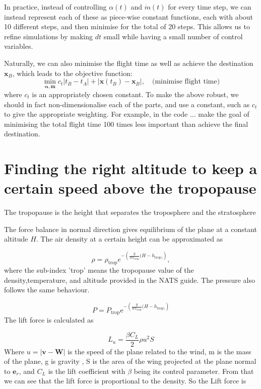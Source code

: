 \documentclass{article}
\renewcommand{\vec}[1]{\boldsymbol{#1}}
\begin{document}
In practice, instead of controlling $\alpha(t)$ and $\dot m(t)$ for every time step, we can instead represent each of these as piece-wise constant functions, each with about 10 different steps, and then minimise for the total of 20 steps. This allows us to refine simulations by making $dt$ small while having a small number of control variables.

Naturally, we can also minimise the flight time as well as achieve the destination $\vec x_B$, which leads to the objective function:
\[
\min_{\vec \alpha, \dot{\vec m}} c_t | t_B - t_A| + | \vec x(t_B) - \vec x_B|, \quad \text{(minimise flight time)}
\]
where $c_t$ is an appropriately chosen constant. To make the above robust, we should in fact non-dimensionalise each of the parts, and use a constant, such as $c_t$ to give the appropriate weighting. For example, in the code ... make the goal of minimising the total flight time 100 times less important than achieve the final destination.

\section{Finding the right altitude to keep a certain speed above the tropopause}

The tropopause is the height that separates the troposphere and the stratosphere 

The force balance in normal direction gives equilibrium of the plane at a constant altitude $H$. 
The air density at a certain height can be approximated as

\begin{equation}
    \rho= \rho_{\text{trop}}e^{-\left( \frac{g}{RT_{\text{trop}}}(H-h_{\text{trop})} \right)},
\end{equation}
where the sub-index 'trop' means the tropopause value of the density,temperature, and altitude provided in the NATS guide. The pressure also follows the same behaviour.

\begin{equation}
    P= P_{\text{trop}}\mathrm{e}^{-\left( \frac{g}{RT_{\text{trop}}}(H-h_{\text{trop})} \right)}
\end{equation}
The lift force is calculated as

\begin{equation}
    L_u= \frac{\beta C_L}{2} \rho u^2S
\end{equation}
Where $u=|\vec{v}-\vec{W}|$ is the speed of the plane related to the wind, m is the mass of the plane, g is gravity , S is the area of the wing  projected at the plane normal to $\vec{e}_r$, and $C_L$ is the lift coefficient with $\beta$ being its control parameter. From that we can see that the lift force is proportional to the density.  So the Lift force is 
\end{document}
